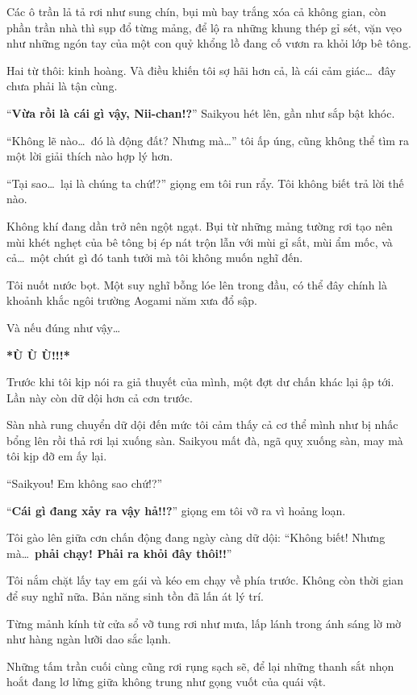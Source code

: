 \documentclass[../main.tex]{subfiles}
\begin{document}
Các ô trần lả tả rơi như sung chín, bụi mù bay trắng xóa cả không gian, còn phần trần nhà thì sụp đổ từng mảng, để lộ ra những khung thép gỉ sét, vặn vẹo như những ngón tay của một con quỷ khổng lồ đang cố vươn ra khỏi lớp bê tông.

Hai từ thôi: kinh hoàng. Và điều khiến tôi sợ hãi hơn cả, là cái cảm giác\dots\ đây chưa phải là tận cùng.

``\textbf{Vừa rồi là cái gì vậy, Nii-chan!?}'' Saikyou hét lên, gần như sắp bật khóc.

``Không lẽ nào\dots\ đó là động đất? Nhưng mà\dots'' tôi ấp úng, cũng không thể tìm ra một lời giải thích nào hợp lý hơn.

``Tại sao\dots\ lại là chúng ta chứ!?'' giọng em tôi run rẩy. Tôi không biết trả lời thế nào.

Không khí đang dần trở nên ngột ngạt. Bụi từ những mảng tường rơi tạo nên mùi khét nghẹt của bê tông bị ép nát trộn lẫn với mùi gỉ sắt, mùi ẩm mốc, và cả\dots\ một chút gì đó tanh tưởi mà tôi không muốn nghĩ đến.

Tôi nuốt nước bọt. Một suy nghĩ bỗng lóe lên trong đầu, có thể đây chính là khoảnh khắc ngôi trường Aogami năm xưa đổ sập.

Và nếu đúng như vậy\dots

\textbf{*Ù Ù Ù!!!*}

Trước khi tôi kịp nói ra giả thuyết của mình, một đợt dư chấn khác lại ập tới. Lần này còn dữ dội hơn cả cơn trước.

Sàn nhà rung chuyển dữ dội đến mức tôi cảm thấy cả cơ thể mình như bị nhấc bổng lên rồi thả rơi lại xuống sàn. Saikyou mất đà, ngã quỵ xuống sàn, may mà tôi kịp đỡ em ấy lại.

``Saikyou! Em không sao chứ!?''

``\textbf{Cái gì đang xảy ra vậy hả!!?}'' giọng em tôi vỡ ra vì hoảng loạn.

Tôi gào lên giữa cơn chấn động đang ngày càng dữ dội: ``Không biết! Nhưng mà\dots\ \textbf{phải chạy! Phải ra khỏi đây thôi!!}''

Tôi nắm chặt lấy tay em gái và kéo em chạy về phía trước. Không còn thời gian để suy nghĩ nữa. Bản năng sinh tồn đã lấn át lý trí.

Từng mảnh kính từ cửa sổ vỡ tung rơi như mưa, lấp lánh trong ánh sáng lờ mờ như hàng ngàn lưỡi dao sắc lạnh.

Những tấm trần cuối cùng cũng rơi rụng sạch sẽ, để lại những thanh sắt nhọn hoắt đang lơ lửng giữa không trung như gọng vuốt của quái vật.
\end{document}
